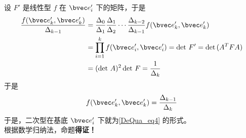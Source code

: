 \begin{enumerate}
设 $F'$ 是线性型 $f$ 在 $\bvec e'_i$ 下的矩阵，于是
\begin{equation}
\begin{aligned}
\frac{f(\bvec e'_k,\bvec e'_k)}{\Delta_{k-1}}&=\frac{\Delta_0}{\Delta_1}\frac{\Delta_1}{\Delta_2}\cdots\frac{\Delta_{k-2}}{\Delta_{k-1}}f(\bvec e'_k,\bvec e'_k)\\
&=\prod_{i=1}^k f(\bvec e'_i,\bvec e'_i)=\det\, F'=\det\, (A^TFA)\\
&=(\det{\,A})^2\det\, F=\frac{1}{\Delta_k}
\end{aligned}
\end{equation}
于是
\begin{equation}
f(\bvec e'_k,\bvec e'_k)=\frac{\Delta_{k-1}}{\Delta_k}
\end{equation}
于是，二次型在基底 $\bvec e'_i$ 下就为\autoref{DeQua_eq4} 的形式。\\
根据数学归纳法，命题\textbf{得证！}
\end{enumerate}
